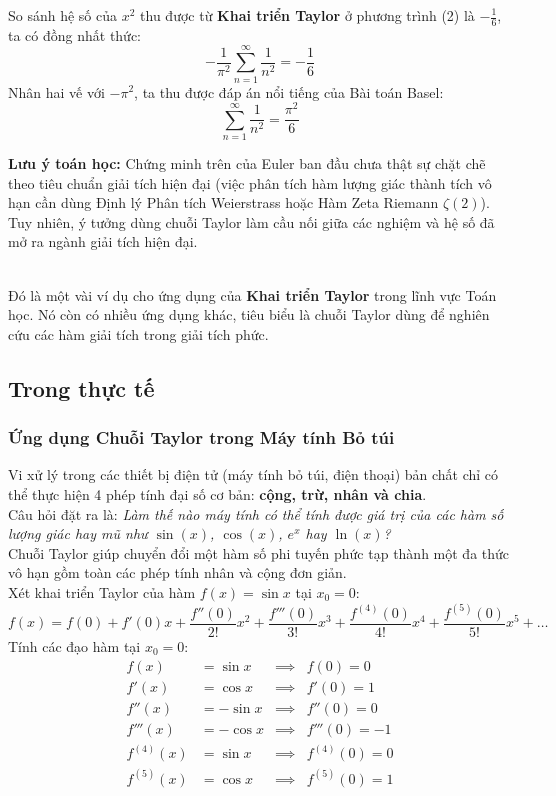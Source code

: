 \documentclass[12pt]{article}
\theoremstyle{definition}
\theoremstyle{remark}
\begin{document}
So sánh hệ số của $x^2$ thu được từ \textbf{Khai triển Taylor} ở phương trình (2) là $-\frac{1}{6}$, ta có đồng nhất thức:
\[
-\frac{1}{\pi^2} \sum_{n=1}^{\infty} \frac{1}{n^2} = -\frac{1}{6}
\]
Nhân hai vế với $-\pi^2$, ta thu được đáp án nổi tiếng của Bài toán Basel:
\[
\sum_{n=1}^{\infty} \frac{1}{n^2} = \frac{\pi^2}{6}
\]
\begin{note}
\textbf{Lưu ý toán học:} Chứng minh trên của Euler ban đầu chưa thật sự chặt chẽ theo tiêu chuẩn giải tích hiện đại (việc phân tích hàm lượng giác thành tích vô hạn cần dùng Định lý Phân tích Weierstrass hoặc Hàm Zeta Riemann $\zeta(2)$). Tuy nhiên, ý tưởng dùng chuỗi Taylor làm cầu nối giữa các nghiệm và hệ số đã mở ra ngành giải tích hiện đại.
\end{note}\\
Đó là một vài ví dụ cho ứng dụng của \textbf{Khai triển Taylor} trong lĩnh vực Toán học. Nó còn có nhiều ứng dụng khác, tiêu biểu là chuỗi Taylor dùng để nghiên cứu các hàm giải tích trong giải tích phức.
\subsection{Trong thực tế}
\subsubsection{Ứng dụng Chuỗi Taylor trong Máy tính Bỏ túi}
Vi xử lý trong các thiết bị điện tử (máy tính bỏ túi, điện thoại) bản chất chỉ có thể thực hiện 4 phép tính đại số cơ bản: \textbf{cộng, trừ, nhân và chia}. \\
Câu hỏi đặt ra là: \textit{Làm thế nào máy tính có thể tính được giá trị của các hàm số lượng giác hay mũ như $\sin(x)$, $\cos(x)$, $e^x$ hay $\ln(x)$?}\\
Chuỗi Taylor giúp chuyển đổi một hàm số phi tuyến phức tạp thành một đa thức vô hạn gồm toàn các phép tính nhân và cộng đơn giản.\\
Xét khai triển Taylor của hàm $f(x) = \sin x$ tại $x_0 = 0$:
\[
f(x) = f(0) + f'(0)x + \frac{f''(0)}{2!}x^2 + \frac{f'''(0)}{3!}x^3 + \frac{f^{(4)}(0)}{4!}x^4 + \frac{f^{(5)}(0)}{5!}x^5 + \dots
\]
Tính các đạo hàm tại $x_0 = 0$:
\begin{align*}
    f(x) &= \sin x &\implies& f(0) = 0 \\
    f'(x) &= \cos x &\implies& f'(0) = 1 \\
    f''(x) &= -\sin x &\implies& f''(0) = 0 \\
    f'''(x) &= -\cos x &\implies& f'''(0) = -1 \\
    f^{(4)}(x) &= \sin x &\implies& f^{(4)}(0) = 0 \\
    f^{(5)}(x) &= \cos x &\implies& f^{(5)}(0) = 1
\end{align*}
\end{document}
